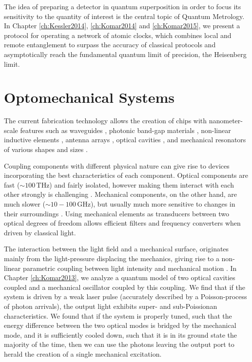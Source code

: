 The idea of preparing a detector in quantum
superposition in order to focus its sensitivity to the quantity of interest is
the central topic of Quantum Metrology. In Chapter \ref{ch:Kessler2014},
\ref{ch:Komar2014} and \ref{ch:Komar2015}, we present a
protocol for operating a network of atomic clocks, which combines local and
remote entanglement to surpass the accuracy of classical protocols and
asymptotically reach the fundamental quantum limit of precision, the Heisenberg limit. 


 
 
 
 
 
 
\section{Optomechanical Systems}
The current fabrication technology allows the creation of chips with
nanometer-scale features such as waveguides \cite{Mekis1996}, photonic band-gap
materials \cite{Foresi1997}, non-linear inductive elements \cite{Makhlin1999},
antenna arrays \cite{Yu2014}, optical cavities \cite{Painter2001}, and
mechanical resonators of various shapes and sizes \cite{Aspelmeyer2014}.

Coupling components with different physical nature can give rise to devices
incorporating the best characteristics of each component.
Optical components are fast ($\sim 100\,\mathrm{THz}$) and fairly isolated,
however making them interact with each other strongly is challenging
\cite{Chang2007}.
Mechanical components, on the other hand, are much slower ($\sim
10-100\,\mathrm{GHz}$), but usually much more sensitive to changes in their
surroundings \cite{Aspelmeyer2014}. Using mechanical elements as transducers
between two optical degrees of freedom allows efficient filters and frequency
converters \cite{Eichenfield2009} when driven by classical light.

The interaction between the light field and a mechanical surface, originates
mainly from the light-pressure displacing the mechanics, giving rise to a
non-linear parametric coupling between light intensity and mechanical motion
\cite{Meystre2013}. In Chapter \ref{ch:Komar2013}, we
analyze a quantum model of two optical cavities coupled and a mechanical
oscillator coupled by this coupling. We find that if the system is driven by a
weak laser pulse (accurately described by a Poisson-process of photon
arrivals), the output light exhibits super- and sub-Poissionan characteristics.
We found that if the system is properly tuned, such that the energy difference between
the two optical modes is bridged by the mechanical mode, and it is sufficiently
cooled down, such that it is in its ground state the majority of the time,
then we can use the photons leaving the output port to herald the creation of a
single mechanical excitation.

